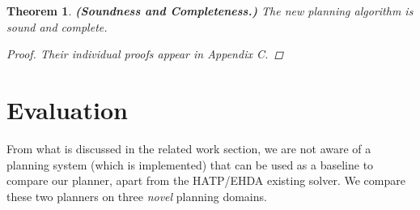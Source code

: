 \documentclass[letterpaper]{article} %
\newtheorem{theorem}{Theorem}[section]
\begin{document}


\begin{theorem}
\textbf{(Soundness and Completeness.)} The new planning algorithm is sound and complete.
\vspace{-0.06in}
\begin{proof}
Their individual proofs appear in Appendix C.
\end{proof}
\end{theorem}
    

\section{Evaluation} \label{sec:eval}
From what is discussed in the related work section, we are not aware of a planning system (which is implemented) that can be used as a baseline to compare our planner, apart from the HATP/EHDA existing solver. We compare these two planners on three \textit{novel} planning domains.
\end{document}
